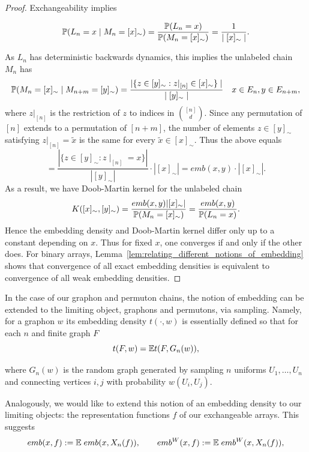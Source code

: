 \begin{proof}
Exchangeability implies

\[\P(L_n = x \; |\; M_n = [x]_\sim) = \frac{\P(L_n = x)}{\P(M_n = [x]_\sim) }=\frac{1}{| \; [x]_\sim \; |}.\]

\noindent As $L_n$ has deterministic backwards dynamics, this implies the unlabeled chain $M_n$
has
%
    \[\P(M_{n} = [x]_\sim \mid M_{n+m} = [y]_\sim) = \frac{| \{z \in [y]_\sim : z|_{[n]} \in [x]_\sim\} \; |}{|\; [y]_\sim \; |} \quad x \in E_n, y \in E_{n+m},\]
%
\noindent where $z|_{[n]}$ is the restriction of $z$ to indices in $\binom{[n]}{d}$. Since any
permutation of $[n]$ extends to a permutation of $[n+m]$, the number of elements
$z\in[y]_\sim$ satisfying $z|_{[n]}=\widetilde x$ is the same for every $\widetilde x\in[x]_\sim$.
Thus the above equals
%
    \[= \frac{|\{z \in [y]_\sim : z\mid_{[n]} = x \}| }{|[y]_\sim|} \cdot |[x]_\sim| = emb(x,y) \cdot |[x]_\sim|.\]
%
\noindent As a result, we have Doob-Martin kernel for the unlabeled chain
%
    \[K([x]_\sim, [y]_\sim) = \frac{emb(x, y) |[x]_\sim|}{\P(M_n = [x]_\sim)} = \frac{emb(x,y)}{\P(L_n = x)}.\]
%
\noindent Hence the embedding density and Doob-Martin kernel differ only up to a constant depending on $x$.
Thus for fixed $x$, one converges if and only if the other does.
For binary arrays, Lemma~\ref{lem:relating_different_notions_of_embedding}
shows that convergence of all exact embedding densities is equivalent to
convergence of all weak embedding densities.
\end{proof}

\noindent In the case of our graphon and permuton chains, the notion of
embedding can be extended to the limiting object, graphons and permutons,
 via sampling. Namely, for a graphon $w$ its embedding density $t(\cdot, w)$
  is essentially defined so that for each $n$ and finite graph $F$
%
\[t(F, w) = \E t(F, G_n(w)),\]

\noindent where $G_n(w)$ is the random graph generated by sampling
 $n$ uniforms $U_1,\ldots, U_n$ and connecting vertices $i,j$ with
 probability $w(U_i, U_j)$.

Analogously, we would like to extend this notion of an embedding density
to our limiting objects: the representation functions $f$ of our
exchangeable arrays. This suggests
%
\begin{equation}
    emb(x, f) := \E \; emb(x, X_n(f)), \qquad  emb^W(x, f) := \E \; emb^W(x, X_n(f)),
    \label{eqn:def_embedding_density_representation_function_f}
\end{equation}

